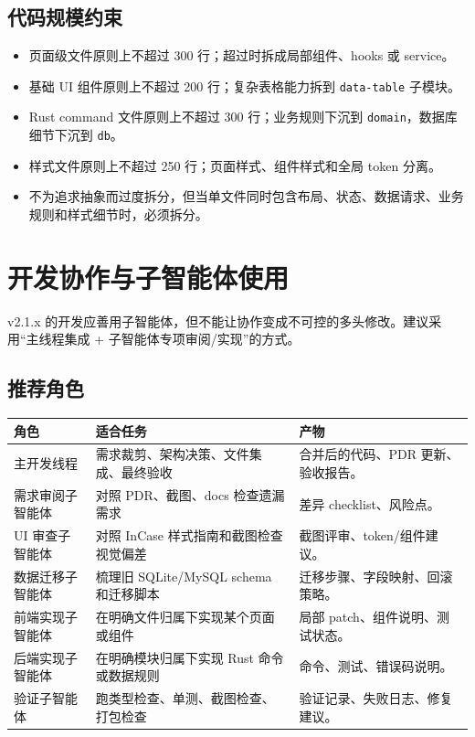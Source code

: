\documentclass[UTF8,zihao=-4]{ctexart}
\begin{document}
\subsection{代码规模约束}

\begin{itemize}
  \item 页面级文件原则上不超过 300 行；超过时拆成局部组件、hooks 或 service。
  \item 基础 UI 组件原则上不超过 200 行；复杂表格能力拆到 \texttt{data-table} 子模块。
  \item Rust command 文件原则上不超过 300 行；业务规则下沉到 \texttt{domain}，数据库细节下沉到 \texttt{db}。
  \item 样式文件原则上不超过 250 行；页面样式、组件样式和全局 token 分离。
  \item 不为追求抽象而过度拆分，但当单文件同时包含布局、状态、数据请求、业务规则和样式细节时，必须拆分。
\end{itemize}

\section{开发协作与子智能体使用}

v2.1.x 的开发应善用子智能体，但不能让协作变成不可控的多头修改。建议采用“主线程集成 + 子智能体专项审阅/实现”的方式。

\subsection{推荐角色}

\begin{longtable}{p{3.6cm}p{6.0cm}p{4.8cm}}
\toprule
角色 & 适合任务 & 产物 \\
\midrule
主开发线程 & 需求裁剪、架构决策、文件集成、最终验收 & 合并后的代码、PDR 更新、验收报告。 \\
需求审阅子智能体 & 对照 PDR、截图、docs 检查遗漏需求 & 差异 checklist、风险点。 \\
UI 审查子智能体 & 对照 InCase 样式指南和截图检查视觉偏差 & 截图评审、token/组件建议。 \\
数据迁移子智能体 & 梳理旧 SQLite/MySQL schema 和迁移脚本 & 迁移步骤、字段映射、回滚策略。 \\
前端实现子智能体 & 在明确文件归属下实现某个页面或组件 & 局部 patch、组件说明、测试状态。 \\
后端实现子智能体 & 在明确模块归属下实现 Rust 命令或数据规则 & 命令、测试、错误码说明。 \\
验证子智能体 & 跑类型检查、单测、截图检查、打包检查 & 验证记录、失败日志、修复建议。 \\
\bottomrule
\end{longtable}
\end{document}
